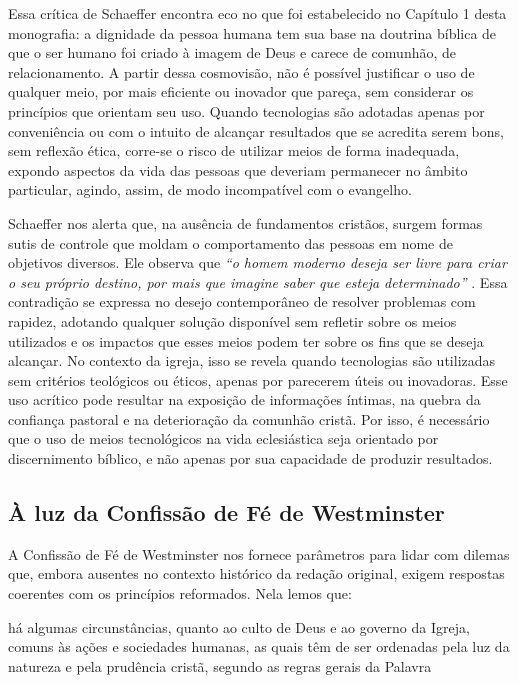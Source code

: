 Essa crítica de Schaeffer encontra eco no que foi estabelecido no Capítulo 1 desta monografia: a dignidade da pessoa humana tem sua base na doutrina bíblica de que o ser humano foi criado à imagem de Deus e carece de comunhão, de relacionamento. A partir dessa cosmovisão, não é possível justificar o uso de qualquer meio, por mais eficiente ou inovador que pareça, sem considerar os princípios que orientam seu uso. Quando tecnologias são adotadas apenas por conveniência ou com o intuito de alcançar resultados que se acredita serem bons, sem reflexão ética, corre-se o risco de utilizar meios de forma inadequada, expondo aspectos da vida das pessoas que deveriam permanecer no âmbito particular, agindo, assim, de modo incompatível com o evangelho.

Schaeffer nos alerta que, na ausência de fundamentos cristãos, surgem formas sutis de controle que moldam o comportamento das pessoas em nome de objetivos diversos. Ele observa que \textit{``o homem moderno deseja ser livre para criar o seu próprio destino, por mais que imagine saber que esteja determinado''} \cite[p.~166]{schaeffer2002}. Essa contradição se expressa no desejo contemporâneo de resolver problemas com rapidez, adotando qualquer solução disponível sem refletir sobre os meios utilizados e os impactos que esses meios podem ter sobre os fins que se deseja alcançar. No contexto da igreja, isso se revela quando tecnologias são utilizadas sem critérios teológicos ou éticos, apenas por parecerem úteis ou inovadoras. Esse uso acrítico pode resultar na exposição de informações íntimas, na quebra da confiança pastoral e na deterioração da comunhão cristã. Por isso, é necessário que o uso de meios tecnológicos na vida eclesiástica seja orientado por discernimento bíblico, e não apenas por sua capacidade de produzir resultados.

\subsection{À luz da Confissão de Fé de Westminster}

A Confissão de Fé de Westminster nos fornece parâmetros para lidar com dilemas que, embora ausentes no contexto histórico da redação original, exigem respostas coerentes com os princípios reformados. Nela lemos que:

\begin{citacao}
    há algumas circunstâncias, quanto ao culto de Deus e ao governo da Igreja, comuns às ações e sociedades humanas, as quais têm de ser ordenadas pela luz da natureza e pela prudência cristã, segundo as regras gerais da Palavra \cite[Cap.~I, §~VI]{cfw}    
\end{citacao}

